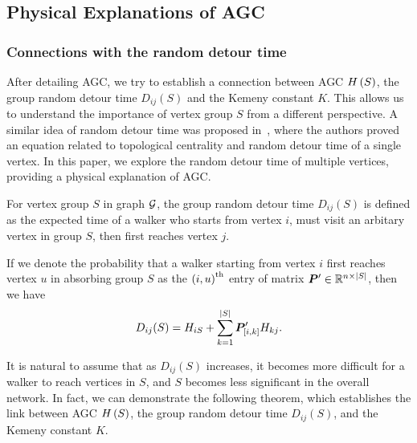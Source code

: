 \documentclass[10pt,twocolumn,twoside]{IEEEtran}
\begin{document}
\subsection{Physical Explanations of AGC}

\subsubsection{Connections with the random detour time}

After detailing AGC, we try to establish a connection between AGC \(H\left(S\right)\), the group random detour time \(D_{ij}(S)\) and the Kemeny constant \(K\).
This allows us to understand the importance of vertex group \(S\) from a different perspective.
A similar idea of random detour time was proposed in~\cite{RaZh13}, where the authors proved an equation related to topological centrality and random detour time of a single vertex.
In this paper, we explore the random detour time of multiple vertices, providing a physical explanation of AGC.

For vertex group \(S\) in graph \(\mathcal{G}\), the group random detour time \(D_{ij}(S)\) is defined as the expected time of a walker who starts from vertex \(i\), must visit an arbitary vertex in group \(S\), then first reaches vertex \(j\).

\begin{definition}\label{def:detour-multiple}
    If we denote the probability that a walker starting from vertex \(i\) first reaches vertex \(u\) in absorbing group \(S\) as the \({(i,u)}^{\rm{th}}\) entry of matrix \(\boldsymbol{P}'\in\mathbb{R}^{n\times\left|S \right|}\), then we have
    \begin{equation*}
        D_{ij}(S)= H_{iS}+\sum_{k=1}^{\left|S \right|}\boldsymbol{P}'_{[i,k]}H_{kj}.
    \end{equation*}
\end{definition}

It is natural to assume that as \(D_{ij}(S)\) increases, it becomes more difficult for a walker to reach vertices in \(S\), and \(S\) becomes less significant in the overall network. In fact, we can demonstrate the following theorem, which establishes the link between AGC \(H\left(S\right)\), the group random detour time \(D_{ij}(S)\), and the Kemeny constant \(K\).
\end{document}
